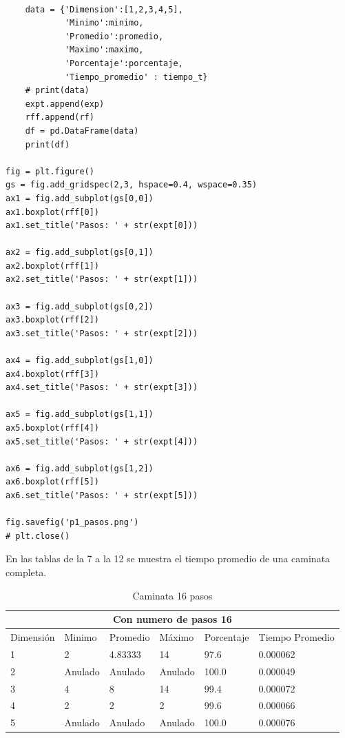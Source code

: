 \documentclass{article}
\begin{document}
\begin{verbatim}
            
    data = {'Dimension':[1,2,3,4,5], 
            'Minimo':minimo, 
            'Promedio':promedio, 
            'Maximo':maximo,
            'Porcentaje':porcentaje,
            'Tiempo_promedio' : tiempo_t} 
    # print(data)
    expt.append(exp)
    rff.append(rf)
    df = pd.DataFrame(data)
    print(df)
        
fig = plt.figure()
gs = fig.add_gridspec(2,3, hspace=0.4, wspace=0.35)
ax1 = fig.add_subplot(gs[0,0])
ax1.boxplot(rff[0])
ax1.set_title('Pasos: ' + str(expt[0]))

ax2 = fig.add_subplot(gs[0,1])
ax2.boxplot(rff[1])
ax2.set_title('Pasos: ' + str(expt[1]))
                      
ax3 = fig.add_subplot(gs[0,2])
ax3.boxplot(rff[2])
ax3.set_title('Pasos: ' + str(expt[2]))

ax4 = fig.add_subplot(gs[1,0])
ax4.boxplot(rff[3])
ax4.set_title('Pasos: ' + str(expt[3]))

ax5 = fig.add_subplot(gs[1,1])
ax5.boxplot(rff[4])
ax5.set_title('Pasos: ' + str(expt[4]))

ax6 = fig.add_subplot(gs[1,2])
ax6.boxplot(rff[5])
ax6.set_title('Pasos: ' + str(expt[5]))

fig.savefig('p1_pasos.png')
# plt.close()

\end{verbatim}

En las tablas de la 7 a la 12 se muestra el tiempo promedio de una caminata completa.\\

\begin{table}[H]
\centering
\begin{tabular}{ |p{2cm}||p{2cm}|p{2cm}|p{2cm}|p{2cm  }|p{2cm}|}
 \hline
 \multicolumn{6}{|c|}{Con numero de pasos 16} \\
 \hline
 Dimensión&Minimo&Promedio&Máximo&Porcentaje&Tiempo Promedio\\
 \hline
 1   & 2       & 4.83333  & 14      & 97.6  & 0.000062\\
 2   & Anulado & Anulado  & Anulado & 100.0 & 0.000049\\
 3   & 4       & 8        & 14      & 99.4  & 0.000072\\
 4   & 2       & 2        & 2       & 99.6  & 0.000066\\
 5   & Anulado & Anulado  & Anulado & 100.0 & 0.000076\\
 \hline
\end{tabular}
\caption{Caminata 16 pasos}
\label{table:7}
\end{table}
\end{document}

